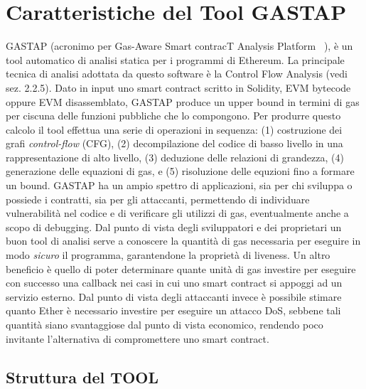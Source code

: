 
	\newpage

\section{Caratteristiche del Tool GASTAP}

GASTAP (acronimo per Gas-Aware Smart contracT Analysis Platform ~\cite{DBLP:journals/corr/abs-1811-10403}), è un tool automatico di analisi statica per i programmi di Ethereum. La principale tecnica di analisi adottata da questo software è la Control Flow Analysis (vedi sez. 2.2.5).\newline
\indent Dato in input uno smart contract scritto in Solidity, EVM bytecode oppure EVM disassemblato, GASTAP produce un upper bound in termini di gas per ciscuna delle funzioni pubbliche che lo compongono. Per produrre questo calcolo il tool effettua una serie di operazioni in sequenza: (1) costruzione dei grafi \textit{control-flow} (CFG), (2) decompilazione del codice di basso livello in una rappresentazione di alto livello, (3) deduzione delle relazioni di grandezza, (4) generazione delle equazioni di gas, e (5) risoluzione delle equzioni fino a formare un bound.\newline
\indent GASTAP ha un ampio spettro di applicazioni, sia per chi sviluppa o possiede i contratti, sia per gli attaccanti, permettendo di individuare vulnerabilità nel codice e di verificare gli utilizzi di gas, eventualmente anche a scopo di debugging.
Dal punto di vista degli sviluppatori e dei proprietari un buon tool di analisi serve a conoscere la quantità di gas necessaria per eseguire in modo \textit{sicuro} il programma, garantendone la proprietà di liveness. Un altro beneficio è quello di poter determinare quante unità di gas investire per eseguire con successo una callback nei casi in cui uno smart contract si appoggi ad un servizio esterno.
Dal punto di vista degli attaccanti invece è possibile stimare quanto Ether è necessario investire per eseguire un attacco DoS, sebbene tali quantità siano svantaggiose dal punto di vista economico, rendendo poco invitante l'alternativa di compromettere uno smart contract.\newline

    \subsection{Struttura del TOOL}
    
